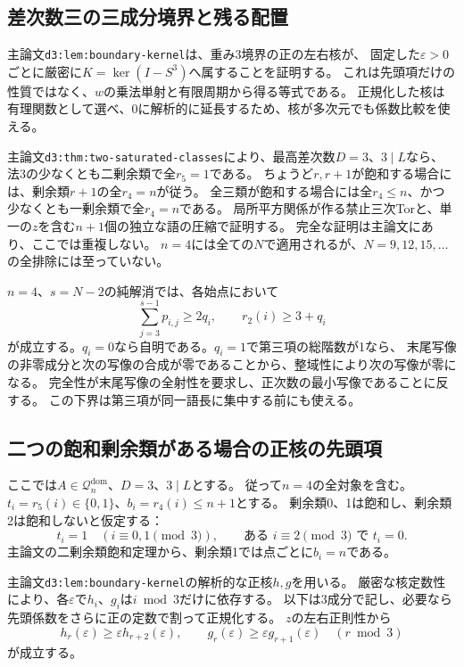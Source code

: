 \documentclass[11pt,a4paper]{ltjsarticle}
\begin{document}
\subsection{差次数三の三成分境界と残る配置}
\label{note:n4-three-class-boundary}
主論文\texttt{d3:lem:boundary-kernel}は、重み3境界の正の左右核が、
固定した$\varepsilon>0$ごとに厳密に$K=\ker(I-S^3)$へ属することを証明する。
これは先頭項だけの性質ではなく、$w$の乗法単射と有限周期から得る等式である。
正規化した核は有理関数として選べ、0に解析的に延長するため、核が多次元でも係数比較を使える。

主論文\texttt{d3:thm:two-saturated-classes}により、最高差次数$D=3$、$3\mid L$なら、
法3の少なくとも二剰余類で全$r_5=1$である。
ちょうど$r,r+1$が飽和する場合には、剰余類$r+1$の全$r_4=n$が従う。
全三類が飽和する場合には全$r_4\le n$、かつ少なくとも一剰余類で全$r_4=n$である。
局所平方関係が作る禁止三次Torと、単一の$z$を含む$n+1$個の独立な語の圧縮で証明する。
完全な証明は主論文にあり、ここでは重複しない。
$n=4$には全ての$N$で適用されるが、$N=9,12,15,\ldots$の全排除には至っていない。

$n=4$、$s=N-2$の純解消では、各始点において
\[
\sum_{j=3}^{s-1}p_{i,j}\ge2q_i,\qquad r_2(i)\ge3+q_i
\]
が成立する。$q_i=0$なら自明である。$q_i=1$で第三項の総階数が1なら、
末尾写像の非零成分と次の写像の合成が零であることから、整域性により次の写像が零になる。
完全性が末尾写像の全射性を要求し、正次数の最小写像であることに反する。
この下界は第三項が同一語長に集中する前にも使える。

\subsection{二つの飽和剰余類がある場合の正核の先頭項}
\label{note:d3-two-saturated-leading}

ここでは$A\in\mathcal Q_n^{\mathrm{dom}}$、$D=3$、$3\mid L$とする。
従って$n=4$の全対象を含む。
$t_i=r_5(i)\in\{0,1\}$、$b_i=r_4(i)\le n+1$とする。
剰余類0、1は飽和し、剰余類2は飽和しないと仮定する：
\[
 t_i=1\quad(i\equiv0,1\pmod3),
 \qquad \text{ある }i\equiv2\pmod3\text{ で }t_i=0.
\]
主論文の二剰余類飽和定理から、剰余類1では点ごとに$b_i=n$である。

主論文\texttt{d3:lem:boundary-kernel}の解析的な正核$h,g$を用いる。
厳密な核定数性により、各$\varepsilon$で$h_i$、$g_i$は$i\bmod3$だけに依存する。
以下は3成分で記し、必要なら先頭係数をさらに正の定数で割って正規化する。
$z$の左右正則性から
\[
 h_r(\varepsilon)\ge\varepsilon h_{r+2}(\varepsilon),
 \qquad
 g_r(\varepsilon)\ge\varepsilon g_{r+1}(\varepsilon)
 \quad(r\bmod3)
\]
が成立する。
\end{document}
